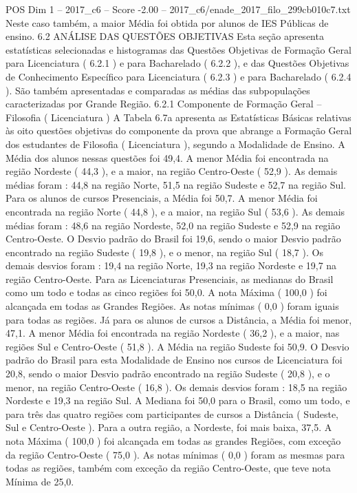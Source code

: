 \begin{textsample}{POS Dim 1 – 2017\_c6 – Score -2.00 – 2017\_c6/enade\_2017\_filo\_299cb010c7.txt}
Neste caso também, a maior Média foi obtida por alunos de IES Públicas de ensino. 6.2 ANÁLISE DAS QUESTÕES OBJETIVAS Esta seção apresenta estatísticas selecionadas e histogramas das Questões Objetivas de Formação Geral para Licenciatura ( 6.2.1 ) e para Bacharelado ( 6.2.2 ), e das Questões Objetivas de Conhecimento Específico para Licenciatura ( 6.2.3 ) e para Bacharelado ( 6.2.4 ).
São também apresentadas e comparadas as médias das subpopulações caracterizadas por Grande Região. 6.2.1 Componente de Formação Geral – Filosofia ( Licenciatura ) A Tabela 6.7a apresenta as Estatísticas Básicas relativas às oito questões objetivas do componente da prova que abrange a Formação Geral dos estudantes de Filosofia ( Licenciatura ), segundo a Modalidade de Ensino.
A Média dos alunos nessas questões foi 49,4.
A menor Média foi encontrada na região Nordeste ( 44,3 ), e a maior, na região Centro-Oeste ( 52,9 ).
As demais médias foram : 44,8 na região Norte, 51,5 na região Sudeste e 52,7 na região Sul.
Para os alunos de cursos Presenciais, a Média foi 50,7.
A menor Média foi encontrada na região Norte ( 44,8 ), e a maior, na região Sul ( 53,6 ).
As demais médias foram : 48,6 na região Nordeste, 52,0 na região Sudeste e 52,9 na região Centro-Oeste.
O Desvio padrão do Brasil foi 19,6, sendo o maior Desvio padrão encontrado na região Sudeste ( 19,8 ), e o menor, na região Sul ( 18,7 ).
Os demais desvios foram : 19,4 na região Norte, 19,3 na região Nordeste e 19,7 na região Centro-Oeste.
Para as Licenciaturas Presenciais, as medianas do Brasil como um todo e todas as cinco regiões foi 50,0.
A nota Máxima ( 100,0 ) foi alcançada em todas as Grandes Regiões.
As notas mínimas ( 0,0 ) foram iguais para todas as regiões.
Já para os alunos de cursos a Distância, a Média foi menor, 47,1.
A menor Média foi encontrada na região Nordeste ( 36,2 ), e a maior, nas regiões Sul e Centro-Oeste ( 51,8 ).
A Média na região Sudeste foi 50,9.
O Desvio padrão do Brasil para esta Modalidade de Ensino nos cursos de Licenciatura foi 20,8, sendo o maior Desvio padrão encontrado na região Sudeste ( 20,8 ), e o menor, na região Centro-Oeste ( 16,8 ).
Os demais desvios foram : 18,5 na região Nordeste e 19,3 na região Sul.
A Mediana foi 50,0 para o Brasil, como um todo, e para três das quatro regiões com participantes de cursos a Distância ( Sudeste, Sul e Centro-Oeste ).
Para a outra região, a Nordeste, foi mais baixa, 37,5.
A nota Máxima ( 100,0 ) foi alcançada em todas as grandes Regiões, com exceção da região Centro-Oeste ( 75,0 ).
As notas mínimas ( 0,0 ) foram as mesmas para todas as regiões, também com exceção da região Centro-Oeste, que teve nota Mínima de 25,0.

\end{textsample}
